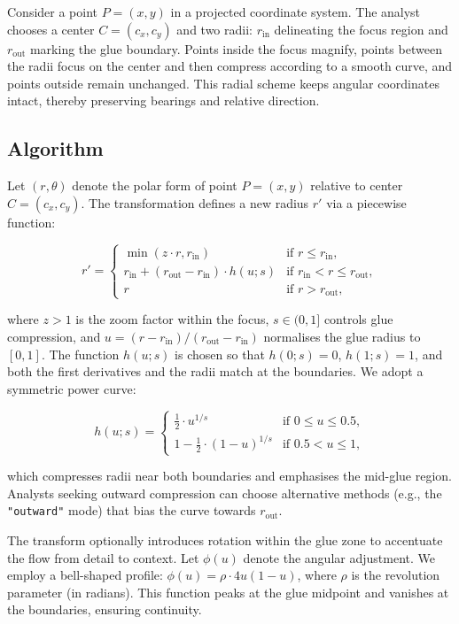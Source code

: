 Consider a point \(P = (x, y)\) in a projected coordinate system. The analyst chooses a center \(C =
(c_x, c_y)\) and two radii: \(r_{\text{in}}\) delineating the focus region and \(r_{\text{out}}\)
marking the glue boundary. Points inside the focus magnify, points between the radii focus on the center and then compress according to a smooth curve, and points outside remain unchanged. This radial scheme keeps angular
coordinates intact, thereby preserving bearings and relative direction.

\subsection{Algorithm}\label{algorithm}

Let \((r, \theta)\) denote the polar form of point \(P = (x, y)\) relative to center \(C = (c_x, c_y)\). The transformation defines a new radius \(r'\) via a piecewise function:

\[
 r' = 
 \begin{cases}
   \min\left( z \cdot r, r_{\text{in}} \right) & \text{if } r \le r_{\text{in}}, \\
   r_{\text{in}} + (r_{\text{out}} - r_{\text{in}}) \cdot h(u; s) & \text{if } r_{\text{in}} < r \le r_{\text{out}}, \\
   r & \text{if } r > r_{\text{out}},
 \end{cases}
\]

where \(z > 1\) is the zoom factor within the focus, \(s \in (0, 1]\) controls glue compression, and
\(u = { (r - r_{\text{in}}) }/{ (r_{\text{out}} - r_{\text{in}}) }\) normalises the glue radius to
\([0,1]\). The function \(h(u; s)\) is chosen so that \(h(0; s) = 0\), \(h(1; s) = 1\), and both the
first derivatives and the radii match at the boundaries. We adopt a symmetric power curve:

\[
 h(u; s) = 
 \begin{cases}
   \tfrac{1}{2} \cdot u^{1/s} & \text{if } 0 \le u \le 0.5, \\
   1 - \tfrac{1}{2} \cdot (1 - u)^{1/s} & \text{if } 0.5 < u \le 1,
 \end{cases}
\]

which compresses radii near both boundaries and emphasises the mid-glue region. Analysts seeking
outward compression can choose alternative methods (e.g., the \texttt{"outward"} mode) that bias the curve
towards \(r_{\text{out}}\).

The transform optionally introduces rotation within the glue zone to accentuate the flow from detail
to context. Let \(\phi(u)\) denote the angular adjustment. We employ a bell-shaped profile:
\(\phi(u) = \rho \cdot 4u(1-u)\), where \(\rho\) is the revolution parameter (in radians). This
function peaks at the glue midpoint and vanishes at the boundaries, ensuring continuity.

